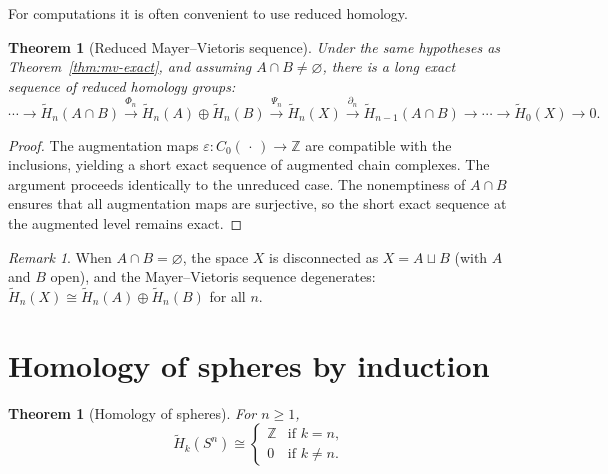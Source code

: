 \documentclass[12pt,a4paper,openany]{book}
\theoremstyle{definition}
\theoremstyle{plain}
\newtheorem{theorem}[definition]{Theorem}
\theoremstyle{remark}
\newtheorem{remark}[definition]{Remark}
\newcommand{\Z}{\mathbb{Z}}
\begin{document}
For computations it is often convenient to use reduced homology.

\begin{theorem}[Reduced Mayer--Vietoris sequence]\label{thm:mv-reduced}
Under the same hypotheses as Theorem~\ref{thm:mv-exact}, and assuming
$A\cap B\neq\varnothing$, there is a long exact sequence of reduced
homology groups:
\[
\cdots \to \tilde{H}_n(A\cap B) \xrightarrow{\Phi_n}
\tilde{H}_n(A)\oplus\tilde{H}_n(B) \xrightarrow{\Psi_n}
\tilde{H}_n(X) \xrightarrow{\partial_n}
\tilde{H}_{n-1}(A\cap B) \to \cdots
\to \tilde{H}_0(X) \to 0.
\]
\end{theorem}

\begin{proof}
The augmentation maps $\varepsilon\colon C_0(\,\cdot\,)\to\Z$ are
compatible with the inclusions, yielding a short exact sequence of
augmented chain complexes. The argument proceeds identically to the
unreduced case. The nonemptiness of $A\cap B$ ensures that all
augmentation maps are surjective, so the short exact sequence at the
augmented level remains exact.
\end{proof}

\begin{remark}
When $A\cap B=\varnothing$, the space $X$ is disconnected as
$X=A\sqcup B$ (with $A$ and $B$ open), and the Mayer--Vietoris
sequence degenerates:
$\tilde{H}_n(X)\cong\tilde{H}_n(A)\oplus\tilde{H}_n(B)$ for all $n$.
\end{remark}

\section{Homology of spheres by induction}
\label{sec:mv-spheres}

\begin{theorem}[Homology of spheres]\label{thm:homology-spheres}
For $n\geq 1$,
\[
  \tilde{H}_k(S^n) \cong
  \begin{cases}
    \Z & \text{if } k=n,\\
    0  & \text{if } k\neq n.
  \end{cases}
\]
\end{theorem}
\end{document}
